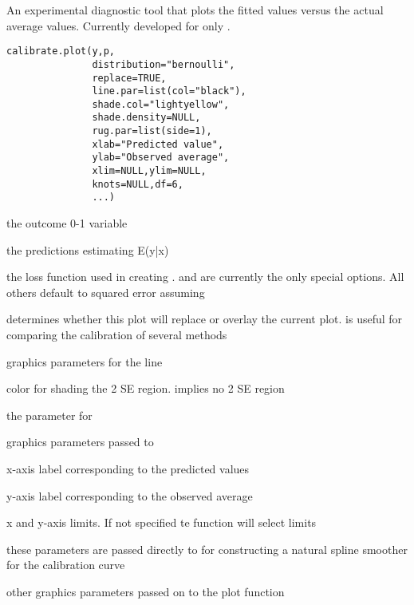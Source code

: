 \documentclass{article}
\begin{document}
\begin{Description}\relax
An experimental diagnostic tool that plots the fitted values versus the actual average values.
Currently developed for only .
\end{Description}
\begin{Usage}
\begin{verbatim}
calibrate.plot(y,p,
               distribution="bernoulli",
               replace=TRUE,
               line.par=list(col="black"),
               shade.col="lightyellow",
               shade.density=NULL,
               rug.par=list(side=1),
               xlab="Predicted value",
               ylab="Observed average",
               xlim=NULL,ylim=NULL,
               knots=NULL,df=6,
               ...)
\end{verbatim}
\end{Usage}
\begin{Arguments}
\begin{ldescription}
\item[\code{y}] the outcome 0-1 variable 
\item[\code{p}] the predictions estimating E(y|x) 
\item[\code{distribution}] the loss function used in creating .
 and  are currently the
only special options. All others default to squared error
assuming 
\item[\code{replace}] determines whether this plot will replace or overlay the current plot.
 is useful for comparing the calibration of several
methods
\item[\code{line.par}] graphics parameters for the line 
\item[\code{shade.col}] color for shading the 2 SE region.  implies no 2 SE
region
\item[\code{shade.density}] the  parameter for 
\item[\code{rug.par}] graphics parameters passed to 
\item[\code{xlab}] x-axis label corresponding to the predicted values
\item[\code{ylab}] y-axis label corresponding to the observed average
\item[\code{xlim,ylim}] x and y-axis limits. If not specified te function will select
limits
\item[\code{knots,df}] these parameters are passed directly to 
 for constructing a natural spline 
smoother for the calibration curve
\item[\code{...}] other graphics parameters passed on to the plot function 
\end{ldescription}
\end{Arguments}
\end{document}
